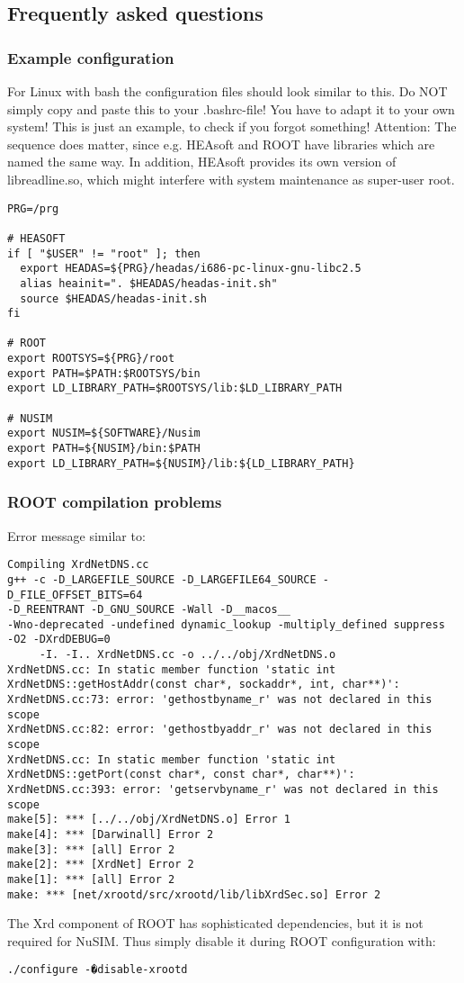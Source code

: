 \subsection{Frequently asked questions}

\subsubsection{Example configuration}
For Linux with bash the configuration files should look similar to this. Do NOT simply copy and paste this to your .bashrc-file! You have to adapt it to your own system! This is just an example, to check if you forgot something! 
Attention: The sequence does matter, since e.g. HEAsoft and ROOT have libraries which are named the same way. In addition, HEAsoft provides its own version of libreadline.so, which might interfere with system maintenance as super-user root. 
 
\begin{verbatim}
PRG=/prg

# HEASOFT
if [ "$USER" != "root" ]; then
  export HEADAS=${PRG}/headas/i686-pc-linux-gnu-libc2.5
  alias heainit=". $HEADAS/headas-init.sh"
  source $HEADAS/headas-init.sh
fi

# ROOT
export ROOTSYS=${PRG}/root
export PATH=$PATH:$ROOTSYS/bin
export LD_LIBRARY_PATH=$ROOTSYS/lib:$LD_LIBRARY_PATH

# NUSIM
export NUSIM=${SOFTWARE}/Nusim
export PATH=${NUSIM}/bin:$PATH
export LD_LIBRARY_PATH=${NUSIM}/lib:${LD_LIBRARY_PATH}
\end{verbatim}

\subsubsection{ROOT compilation problems}

Error message similar to:
{\scriptsize \begin{verbatim}
Compiling XrdNetDNS.cc
g++ -c -D_LARGEFILE_SOURCE -D_LARGEFILE64_SOURCE -D_FILE_OFFSET_BITS=64 
-D_REENTRANT -D_GNU_SOURCE -Wall -D__macos__  
-Wno-deprecated -undefined dynamic_lookup -multiply_defined suppress  -O2 -DXrdDEBUG=0 
     -I. -I.. XrdNetDNS.cc -o ../../obj/XrdNetDNS.o
XrdNetDNS.cc: In static member function 'static int XrdNetDNS::getHostAddr(const char*, sockaddr*, int, char**)':
XrdNetDNS.cc:73: error: 'gethostbyname_r' was not declared in this scope
XrdNetDNS.cc:82: error: 'gethostbyaddr_r' was not declared in this scope
XrdNetDNS.cc: In static member function 'static int XrdNetDNS::getPort(const char*, const char*, char**)':
XrdNetDNS.cc:393: error: 'getservbyname_r' was not declared in this scope
make[5]: *** [../../obj/XrdNetDNS.o] Error 1
make[4]: *** [Darwinall] Error 2
make[3]: *** [all] Error 2
make[2]: *** [XrdNet] Error 2
make[1]: *** [all] Error 2
make: *** [net/xrootd/src/xrootd/lib/libXrdSec.so] Error 2
\end{verbatim}
}
The Xrd component of ROOT has sophisticated dependencies, but it is not required for NuSIM. Thus simply disable it during ROOT configuration with:
\begin{verbatim}
./configure -�disable-xrootd
\end{verbatim}


